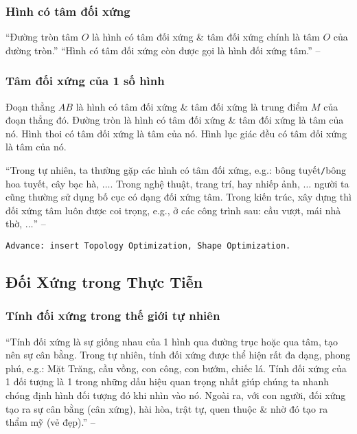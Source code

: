 \documentclass{article}
\numberwithin{equation}{section}
\begin{document}
\subsubsection{Hình có tâm đối xứng}
``Đường tròn tâm $O$ là hình có tâm đối xứng \& tâm đối xứng chính là tâm $O$ của đường tròn.'' ``Hình có tâm đối xứng còn được gọi là hình đối xứng tâm.'' -- \cite[p. 111]{Thai_Anh_Dat_Ha_Loan_Nam_Quang_Toan_6_tap_1}

\subsubsection{Tâm đối xứng của 1 số hình}
Đoạn thẳng $AB$ là hình có tâm đối xứng \& tâm đối xứng là trung điểm $M$ của đoạn thẳng đó. Đường tròn là hình có tâm đối xứng \& tâm đối xứng là tâm của nó. Hình thoi có tâm đối xứng là tâm của nó. Hình lục giác đều có tâm đối xứng là tâm của nó.

``Trong tự nhiên, ta thường gặp các hình có tâm đối xứng, e.g.: bông tuyết\texttt{/}bông hoa tuyết, cây bạc hà, $\ldots$. Trong nghệ thuật, trang trí, hay nhiếp ảnh, $\ldots$ người ta cũng thường sử dụng bố cục có dạng đối xứng tâm. Trong kiến trúc, xây dựng thì đối xứng tâm luôn được coi trọng, e.g., ở các công trình sau: cầu vượt, mái nhà thờ, $\ldots$'' -- \cite[p. 113]{Thai_Anh_Dat_Ha_Loan_Nam_Quang_Toan_6_tap_1}

\texttt{Advance: insert Topology Optimization, Shape Optimization.}

\subsection{Đối Xứng trong Thực Tiễn}

\subsubsection{Tính đối xứng trong thế giới tự nhiên}
``Tính đối xứng là sự giống nhau của 1 hình qua đường trục hoặc qua tâm, tạo nên sự cân bằng. Trong tự nhiên, tính đối xứng được thể hiện rất đa dạng, phong phú, e.g.: Mặt Trăng, cầu vồng, con công, con bướm, chiếc lá. Tính đối xứng của 1 đối tượng là 1 trong những dấu hiệu quan trọng nhất giúp chúng ta nhanh chóng định hình đối tượng đó khi nhìn vào nó. Ngoài ra, với con người, đối xứng tạo ra sự cân bằng (cân xứng), hài hòa, trật tự, quen thuộc \& nhờ đó tạo ra thẩm mỹ (vẻ đẹp).'' -- \cite[p. 114]{Thai_Anh_Dat_Ha_Loan_Nam_Quang_Toan_6_tap_1}
\end{document}
